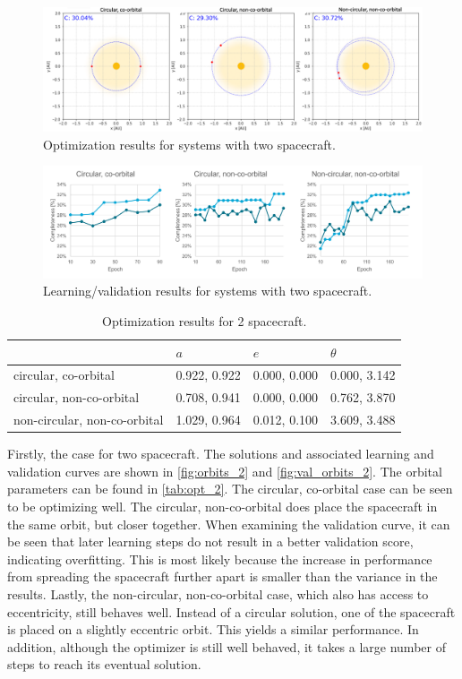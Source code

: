 \begin{figure}[htbp]
 \centering
 \includegraphics[width=1.0\textwidth]{img/orbits_2.png}
 \caption{Optimization results for systems with two spacecraft.}
 \label{fig:orbits_2}
\end{figure}
\begin{figure}[htbp]
 \centering
 \includegraphics[width=1.0\textwidth]{img/val_orbits_2.pdf}
 \caption{Learning/validation results for systems with two spacecraft.}
 \label{fig:val_orbits_2}
\end{figure}

\begin{table}[htbp]
\centering
\caption{Optimization results for 2 spacecraft.}
\label{tab:opt_2}
\begin{tabulary}{1.0\textwidth}{L|LLL}
                             & $a$   & $e$   & $\theta$ \\ \hline
circular, co-orbital         & 0.922, 0.922 & 0.000, 0.000 & 0.000, 3.142   \\
circular, non-co-orbital     & 0.708, 0.941 & 0.000, 0.000 & 0.762, 3.870   \\
non-circular, non-co-orbital & 1.029, 0.964 & 0.012, 0.100 & 3.609, 3.488  
\end{tabulary}
\end{table}

Firstly, the case for two spacecraft. The solutions and associated learning and validation curves are shown in \autoref{fig:orbits_2} and \autoref{fig:val_orbits_2}. The orbital parameters can be found in \autoref{tab:opt_2}. The circular, co-orbital case can be seen to be optimizing well. The circular, non-co-orbital does place the spacecraft in the same orbit, but closer together. When examining the validation curve, it can be seen that later learning steps do not result in a better validation score, indicating overfitting. This is most likely because the increase in performance from spreading the spacecraft further apart is smaller than the variance in the results. Lastly, the non-circular, non-co-orbital case, which also has access to eccentricity, still behaves well. Instead of a circular solution, one of the spacecraft is placed on a slightly eccentric orbit. This yields a similar performance. In addition, although the optimizer is still well behaved, it takes a large number of steps to reach its eventual solution. \\

